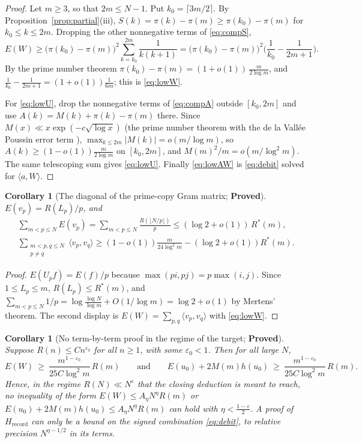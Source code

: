 \documentclass[11pt]{article}
\newtheorem{corollary}[theorem]{Corollary}
\theoremstyle{definition}
\theoremstyle{remark}
\newcommand{\ip}[2]{\langle #1,#2\rangle}
\newcommand{\Hrec}{H_{\mathrm{record}}}
\newcommand{\Rstar}{R^{*}}
\begin{document}
\begin{proof}
Let $m\ge3$, so that $2m\le N-1$. Put $k_0=\lceil3m/2\rceil$. By Proposition~\ref{prop:partial}(iii), $S(k)=\pi(k)-\pi(m)\ge\pi(k_0)-\pi(m)$ for $k_0\le k\le2m$. Dropping the other nonnegative terms of \eqref{eq:compS},
\[
E(W)\ge\big(\pi(k_0)-\pi(m)\big)^2\sum_{k=k_0}^{2m}\frac1{k(k+1)}=\big(\pi(k_0)-\pi(m)\big)^2\Big(\frac1{k_0}-\frac1{2m+1}\Big).
\]
By the prime number theorem $\pi(k_0)-\pi(m)=(1+o(1))\,\frac{m}{2\log m}$, and $\frac1{k_0}-\frac1{2m+1}=(1+o(1))\frac1{6m}$; this is \eqref{eq:lowW}.

For \eqref{eq:lowU}, drop the nonnegative terms of \eqref{eq:compA} outside $[k_0,2m]$ and use $A(k)=M(k)+\pi(k)-\pi(m)$ there. Since $M(x)\ll x\exp(-c\sqrt{\log x})$ (the prime number theorem with the de la Vall\'ee Poussin error term \cite[Ch.~12]{ivic}), $\max_{k\le2m}|M(k)|=o(m/\log m)$, so $A(k)\ge(1-o(1))\frac m{2\log m}$ on $[k_0,2m]$, and $M(m)^2/m=o(m/\log^2m)$. The same telescoping sum gives \eqref{eq:lowU}. Finally \eqref{eq:lowAW} is \eqref{eq:debit} solved for $\ip aW$.
\end{proof}

\begin{corollary}[The diagonal of the prime-copy Gram matrix; \textbf{Proved}]\label{cor:gram}
$E(v_p)=R(L_p)/p$, and
\begin{gather*}
\sum_{m<p\le N}E(v_p)=\sum_{m<p\le N}\frac{R(\lfloor N/p\rfloor)}p\le(\log2+o(1))\,\Rstar(m),\\
\sum_{\substack{m<p,q\le N\\ p\ne q}}\ip{v_p}{v_q}\ge(1-o(1))\frac m{24\log^2m}-(\log2+o(1))\Rstar(m).
\end{gather*}
\end{corollary}

\begin{proof}
$E(U_pf)=E(f)/p$ because $\max(pi,pj)=p\max(i,j)$. Since $1\le L_p\le m$, $R(L_p)\le\Rstar(m)$, and $\sum_{m<p\le N}1/p=\log\frac{\log N}{\log m}+O(1/\log m)=\log2+o(1)$ by Mertens' theorem. The second display is $E(W)=\sum_{p,q}\ip{v_p}{v_q}$ with \eqref{eq:lowW}.
\end{proof}

\begin{corollary}[No term-by-term proof in the regime of the target; \textbf{Proved}]\label{cor:noterm}
Suppose $R(n)\le Cn^{\varepsilon_0}$ for all $n\ge1$, with some $\varepsilon_0<1$. Then for all large $N$,
\[
E(W)\ \ge\ \frac{m^{1-\varepsilon_0}}{25C\log^2m}\,R(m)\qquad\text{and}\qquad E(u_0)+2M(m)h(u_0)\ \ge\ \frac{m^{1-\varepsilon_0}}{25C\log^2m}\,R(m).
\]
Hence, in the regime $R(N)\ll N^{\varepsilon}$ that the closing deduction is meant to reach, no inequality of the form $E(W)\le A_\eta N^\eta R(m)$ or $E(u_0)+2M(m)h(u_0)\le A_\eta N^\eta R(m)$ can hold with $\eta<\tfrac{1-\varepsilon}2$. A proof of $\Hrec$ can only be a bound on the signed combination \eqref{eq:debit}, to relative precision $N^{\eta-1/2}$ in its terms.
\end{corollary}
\end{document}
